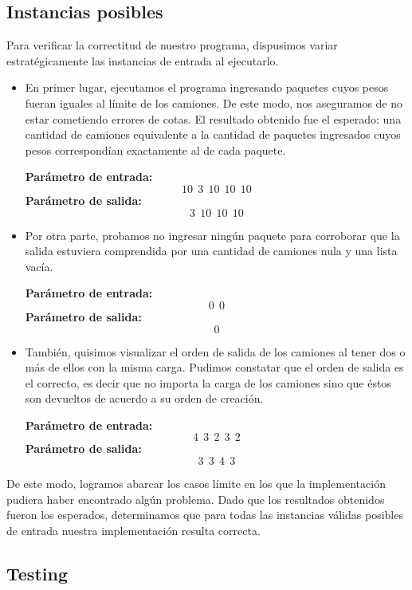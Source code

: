 \subsection{Instancias posibles}
Para verificar la correctitud de nuestro programa, dispusimos variar estratégicamente las instancias de entrada al ejecutarlo.
\begin{itemize}
\item En primer lugar, ejecutamos el programa ingresando paquetes cuyos pesos fueran iguales al límite de los camiones. De este modo, nos aseguramos de no estar cometiendo errores de cotas. El resultado obtenido fue el esperado: una cantidad de camiones equivalente a la cantidad de paquetes ingresados cuyos pesos correspondían exactamente al de cada paquete.\newline

\textbf{Parámetro de entrada:} $$10\ \ 3\ \ 10\ \ 10\ \ 10$$
\textbf{Parámetro de salida:} $$3\ \ 10\ \ 10\ \ 10$$
\item Por otra parte, probamos no ingresar ningún paquete para corroborar que la salida estuviera comprendida por una cantidad de camiones nula y una lista vacía.\newline

\textbf{Parámetro de entrada:} $$0\ \ 0$$
\textbf{Parámetro de salida:} $$0$$
\item También, quisimos visualizar el orden de salida de los camiones al tener dos o más de ellos con la misma carga. Pudimos constatar que el orden de salida es el correcto, es decir que no importa la carga de los camiones sino que éstos son devueltos de acuerdo a su orden de creación.\newline

\textbf{Parámetro de entrada:} $$4\ \ 3\ \ 2\ \ 3\ \ 2$$
\textbf{Parámetro de salida:} $$3\ \ 3\ \ 4\ \ 3$$
\end{itemize}

De este modo, logramos abarcar los casos límite en los que la implementación pudiera haber encontrado algún problema. Dado que los resultados obtenidos fueron los esperados, determinamos que para todas las instancias válidas posibles de entrada nuestra implementación resulta correcta.

\subsection{Testing}

